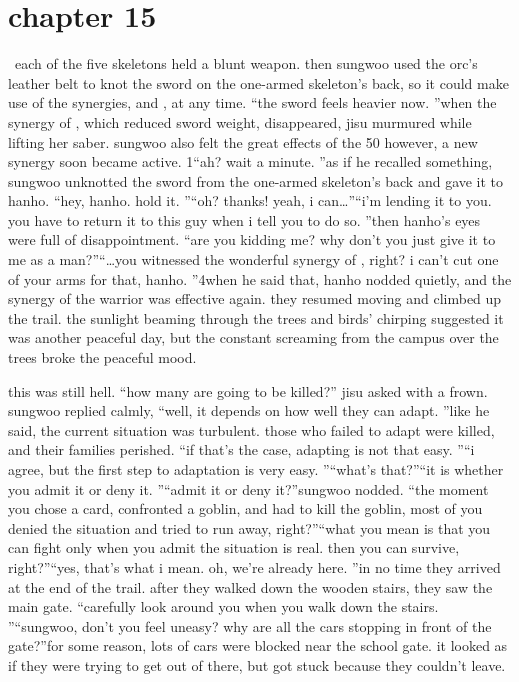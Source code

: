 \section{chapter 15}






 each of the five skeletons held a blunt weapon.
then sungwoo used the orc’s leather belt to knot the sword on the one-armed skeleton’s back, so it could make use of the synergies,  and , at any time.
“the sword feels heavier now.
”when the synergy of , which reduced sword weight, disappeared, jisu murmured while lifting her saber.
 sungwoo also felt the great effects of the 50%
however, a new synergy soon became active.
1“ah? wait a minute.
”as if he recalled something, sungwoo unknotted the sword from the one-armed skeleton’s back and gave it to hanho.
“hey, hanho.
 hold it.
”“oh? thanks! yeah, i can…”“i’m lending it to you.
 you have to return it to this guy when i tell you to do so.
”then hanho’s eyes were full of disappointment.
“are you kidding me? why don’t you just give it to me as a man?”“…you witnessed the wonderful synergy of , right? i can’t cut one of your arms for that, hanho.
”4when he said that, hanho nodded quietly, and the synergy of the warrior was effective again.
they resumed moving and climbed up the trail.
 the sunlight beaming through the trees and birds’ chirping suggested it was another peaceful day, but the constant screaming from the campus over the trees broke the peaceful mood.

this was still hell.
“how many are going to be killed?” jisu asked with a frown.
sungwoo replied calmly, “well, it depends on how well they can adapt.
”like he said, the current situation was turbulent.
 those who failed to adapt were killed, and their families perished.
“if that’s the case, adapting is not that easy.
”“i agree, but the first step to adaptation is very easy.
”“what’s that?”“it is whether you admit it or deny it.
”“admit it or deny it?”sungwoo nodded.
“the moment you chose a card, confronted a goblin, and had to kill the goblin, most of you denied the situation and tried to run away, right?”“what you mean is that you can fight only when you admit the situation is real.
 then you can survive, right?”“yes, that’s what i mean.
 oh, we’re already here.
”in no time they arrived at the end of the trail.
 after they walked down the wooden stairs, they saw the main gate.
“carefully look around you when you walk down the stairs.
”“sungwoo, don’t you feel uneasy? why are all the cars stopping in front of the gate?”for some reason, lots of cars were blocked near the school gate.
 it looked as if they were trying to get out of there, but got stuck because they couldn’t leave.

